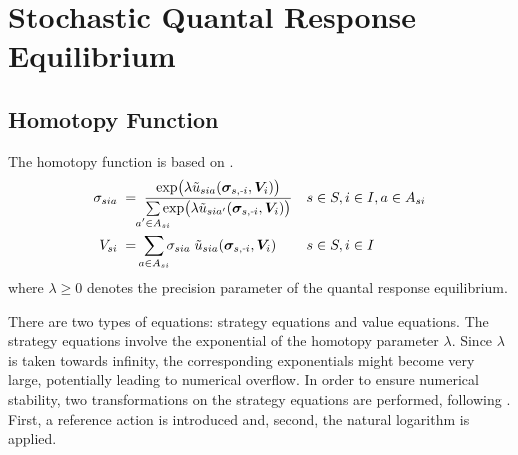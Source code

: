 \documentclass[11pt,fleqn]{article}
\newcommand{\bsigma}{\bm{\sigma}}
\newcommand{\bV}{\bm{V}}
\newcommand{\tu}{\tilde{u}}
\newcommand{\shortminus}{{\text{\scalebox{0.4}[1.0]{\(-\)}}}}
\newcommand{\minusi}{\shortminus i}
\begin{document}
\section{Stochastic Quantal Response Equilibrium}


\subsection*{Homotopy Function}

The homotopy function is based on \citet[eqn.~X, p.~Y]{EibelshaeuserPoensgen2021QRE}. 
\begin{align*}
	\sigma_{sia} & \;=\; \frac{ \exp\bigl(\lambda\tu_{sia}(\bsigma_{s,\minusi},\bV_i)\bigr) }{ \sum\limits_{\mathclap{a'\in A_{si}}} \exp\bigl(\lambda\tu_{sia'}(\bsigma_{s,\minusi},\bV_i)\bigr) } && s\in S, i\in I, a\in A_{si} \\
	V_{si} & \;=\; \sum\limits_{\mathclap{a\in A_{si}}} \sigma_{sia} \; \tilde{u}_{sia}(\bsigma_{s,\minusi},\bV_i) && s\in S, i\in I
\end{align*}
where $\lambda \geq 0$ denotes the precision parameter of the quantal response equilibrium.

There are two types of equations: strategy equations and value equations. The strategy equations involve the exponential of the homotopy parameter $\lambda$. Since $\lambda$ is taken towards infinity, the corresponding exponentials might become very large, potentially leading to numerical overflow. In order to ensure numerical stability, two transformations on the strategy equations are performed, following \cite{Turocy2005, Turocy2010}. First, a reference action is introduced and, second, the natural logarithm is applied. 
\end{document}
